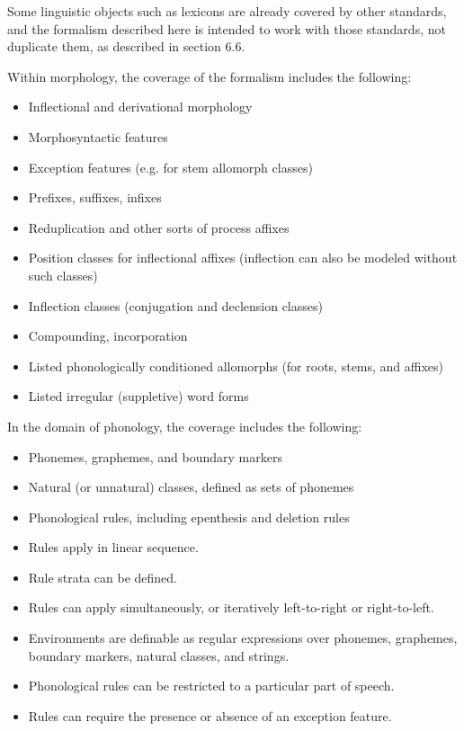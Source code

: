 Some linguistic objects such as lexicons are already covered by other standards, and the formalism described here is intended to work with those standards, not duplicate them, as described in section 6.6.

Within morphology, the coverage of the formalism includes the following:

\begin{itemize}
\item Inflectional and derivational morphology
\item Morphosyntactic features
\item Exception features (e.g. for stem allomorph classes)
\item Prefixes, suffixes, infixes
\item Reduplication and other sorts of process affixes
\item Position classes for inflectional affixes (inflection can also be modeled without such classes)
\item Inflection classes (conjugation and declension classes) 
\item Compounding, incorporation
\item Listed phonologically conditioned allomorphs (for roots, stems, and affixes)
\item Listed irregular (suppletive) word forms
\end{itemize}
In the domain of phonology, the coverage includes the following:

\begin{itemize}
\item Phonemes, graphemes, and boundary markers
\item Natural (or unnatural) classes, defined as sets of phonemes
\item Phonological rules, including epenthesis and deletion rules
\end{itemize}

\begin{itemize}
\item Rules apply in linear sequence.
\item Rule strata can be defined.
\item Rules can apply simultaneously, or iteratively left-to-right or right-to-left.
\item Environments are definable as regular expressions over phonemes, graphemes, boundary markers, natural classes, and strings.
\item Phonological rules can be restricted to a particular part of speech.
\item Rules can require the presence or absence of an exception feature.
\end{itemize}

